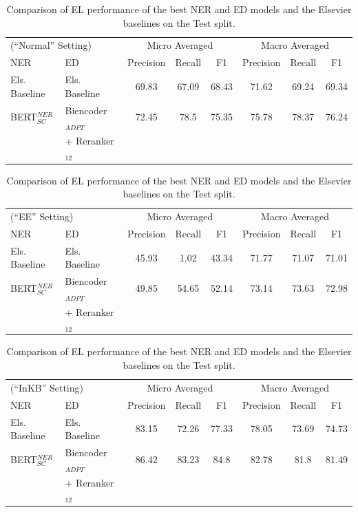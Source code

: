 \documentclass{report}
\theoremstyle{definition}
\theoremstyle{remark}
\begin{document}
\begin{table}[H]
    \centering
    \begin{tabular}{l l c c c| c c c}
    \multicolumn{2}{l}{(``Normal'' Setting)}&\multicolumn{3}{c|}{Micro Averaged}&\multicolumn{3}{c}{Macro Averaged} \\
    NER & ED &Precision&Recall&F1&Precision&Recall&F1\\
    \hline
    Els. Baseline & Els. Baseline & 69.83	&67.09&	68.43&	71.62&	69.24&	69.34
\\
    BERT$_{SC}^{NER}$ & Biencoder$_{ADPT}$ &72.45&78.5&75.35&75.78&78.37&76.24 \\
    & + Reranker$_{12}$&\\
    \end{tabular}
    
    \vspace{0.5cm}\begin{tabular}{l l c c c| c c c}
    \multicolumn{2}{l}{(``EE'' Setting)}&\multicolumn{3}{c|}{Micro Averaged}&\multicolumn{3}{c}{Macro Averaged} \\
    NER & ED &Precision&Recall&F1&Precision&Recall&F1\\
    \hline
    Els. Baseline & Els. Baseline & 45.93&	1.02&	43.34&	71.77&	71.07	&71.01
\\
    BERT$_{SC}^{NER}$ & Biencoder$_{ADPT}$ &49.85&54.65&52.14&73.14&73.63&72.98 \\
    & + Reranker$_{12}$&\\
    \end{tabular}
    
    \vspace{0.5cm}\begin{tabular}{l l c c c| c c c}
    \multicolumn{2}{l}{(``InKB'' Setting)}&\multicolumn{3}{c|}{Micro Averaged}&\multicolumn{3}{c}{Macro Averaged} \\
    NER & ED &Precision&Recall&F1&Precision&Recall&F1\\
    \hline
    Els. Baseline & Els. Baseline & 83.15&	72.26&	77.33&	78.05&	73.69&	74.73
\\
    BERT$_{SC}^{NER}$ & Biencoder$_{ADPT}$ & 86.42&83.23&84.8&82.78&81.8&81.49 \\
    & + Reranker$_{12}$&\\
    \end{tabular}
    \caption{Comparison of EL performance of the best NER and ED models and the Elsevier baselines on the Test split.}
    \label{tab:elresultstest}
\end{table}
\end{document}
